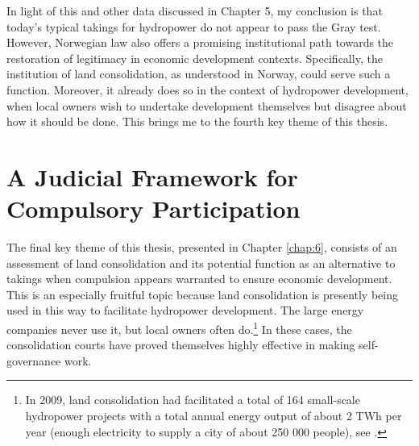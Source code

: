 In light of this and other data discussed in Chapter 5, my conclusion is that today's typical takings for hydropower do not appear to pass the Gray test. However, Norwegian law also offers a promising institutional path towards the restoration of legitimacy in economic development contexts. Specifically, the institution of land consolidation, as understood in Norway, could serve such a function. Moreover, it already does so in the context of hydropower development, when local owners wish to undertake development themselves but disagree about how it should be done. This brings me to the fourth key theme of this thesis.

\section{A Judicial Framework for Compulsory Participation}\label{sec:4}


The final key theme of this thesis, presented in Chapter \ref{chap:6}, consists of an assessment of land consolidation and its potential function as an alternative to takings when compulsion appears warranted to ensure economic development. This is an especially fruitful topic because land consolidation is presently being used in this way to facilitate hydropower development. The large energy companies never use it, but local owners often do.\footnote{In 2009, land consolidation had facilitated a total of 164 small-scale hydropower projects with a total annual energy output of about 2 TWh per year (enough electricity to supply a city of about 250 000 people), see \cite{gevinst09}.} In these cases, the consolidation courts have proved themselves highly effective in making self-governance work. 

